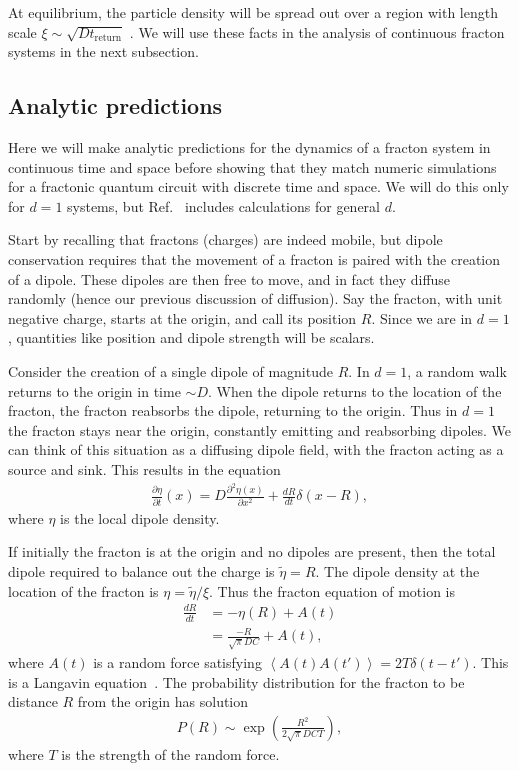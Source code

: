 \documentclass[a4paper,12pt]{article}
\newcommand{\pd}[2]{\frac{\partial #1}{\partial #2}}
\newcommand{\pdn}[3]{\frac{\partial^{#3} #1}{\partial #2^{#3}}}
\newcommand{\nd}[2]{\frac{d #1}{d #2}}
\newcommand{\ex}[1]{\left\langle #1 \right\rangle}
\newcommand{\ret}{\text{return}}
\newcommand{\note}[1]{{\color{red}{#1}}}
\begin{document}
At equilibrium, the particle density will be spread out over a region with length scale $\xi\sim\sqrt{Dt_\ret}$ \note{(Why?)}. We will use these facts in the analysis of continuous fracton systems in the next subsection.

\subsection{Analytic predictions} \label{sub:analytic}

Here we will make analytic predictions for the dynamics of a fracton system in continuous time and space before showing that they match numeric simulations for a fractonic quantum circuit with discrete time and space. We will do this only for $d=1$ systems, but Ref.~\cite{PaiFracton} includes calculations for general $d$.

Start by recalling that fractons (charges) are indeed mobile, but dipole conservation requires that the movement of a fracton is paired with the creation of a dipole. These dipoles are then free to move, and in fact they diffuse randomly (hence our previous discussion of diffusion). Say the fracton, with unit negative charge, starts at the origin, and call its position $R$. Since we are in $d=1$, quantities like position and dipole strength will be scalars.

Consider the creation of a single dipole of magnitude $R$. In $d=1$, a random walk returns to the origin in time $\sim D$.  When the dipole returns to the location of the fracton, the fracton reabsorbs the dipole, returning to the origin. Thus in $d=1$ the fracton stays near the origin, constantly emitting and reabsorbing dipoles. We can think of this situation as a diffusing dipole field, with the fracton acting as a source and sink. This results in the equation
\begin{align}
\pd{\eta}{t}(x) = D\pdn{\eta(x)}{x}{2} + \nd{R}{t}\delta(x-R),
\end{align}
where $\eta$ is the local dipole density.

If initially the fracton is at the origin and no dipoles are present, then the total dipole required to balance out the charge is $\tilde{\eta}=R$. The dipole density at the location of the fracton is $\eta = \tilde{\eta}/\xi$. Thus the fracton equation of motion is
\begin{align}
\nd{R}{t} &= -\eta(R) + A(t)\\
&= \frac{-R}{\sqrt{\pi} DC}+ A(t),
\end{align}
where $A(t)$ is a random force satisfying $\ex{A(t)A(t')} = 2T\delta(t-t')$. \note{The units are very wonky here.} This is a Langavin equation~\cite{MarenduAsp}. The probability distribution for the fracton to be distance $R$ from the origin has solution
\begin{align}
P(R) \sim \exp\left(\frac{R^2}{2\sqrt{\pi}DCT}\right), \label{eqn:lange}
\end{align}
where $T$ is the strength of the random force. 
\end{document}
